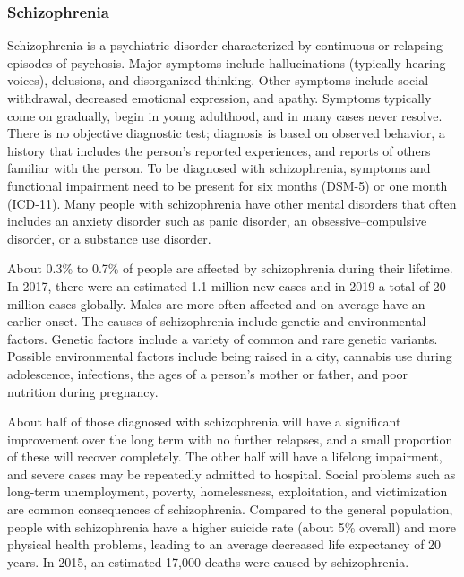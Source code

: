 \hypertarget{schizophrenia}{%
\subsubsection{Schizophrenia}\label{schizophrenia}}

Schizophrenia is a psychiatric disorder characterized by continuous or
relapsing episodes of psychosis. Major symptoms include hallucinations
(typically hearing voices), delusions, and disorganized thinking. Other
symptoms include social withdrawal, decreased emotional expression, and
apathy. Symptoms typically come on gradually, begin in young adulthood,
and in many cases never resolve. There is no objective diagnostic test;
diagnosis is based on observed behavior, a history that includes the
person's reported experiences, and reports of others familiar with the
person. To be diagnosed with schizophrenia, symptoms and functional
impairment need to be present for six months (DSM-5) or one month
(ICD-11). Many people with schizophrenia have other mental disorders
that often includes an anxiety disorder such as panic disorder, an
obsessive--compulsive disorder, or a substance use disorder.

About 0.3\% to 0.7\% of people are affected by schizophrenia during
their lifetime. In 2017, there were an estimated 1.1 million new cases
and in 2019 a total of 20 million cases globally. Males are more often
affected and on average have an earlier onset. The causes of
schizophrenia include genetic and environmental factors. Genetic factors
include a variety of common and rare genetic variants. Possible
environmental factors include being raised in a city, cannabis use
during adolescence, infections, the ages of a person's mother or father,
and poor nutrition during pregnancy.

About half of those diagnosed with schizophrenia will have a significant
improvement over the long term with no further relapses, and a small
proportion of these will recover completely. The other half will have a
lifelong impairment, and severe cases may be repeatedly admitted to
hospital. Social problems such as long-term unemployment, poverty,
homelessness, exploitation, and victimization are common consequences of
schizophrenia. Compared to the general population, people with
schizophrenia have a higher suicide rate (about 5\% overall) and more
physical health problems, leading to an average decreased life
expectancy of 20 years. In 2015, an estimated 17,000 deaths were caused
by schizophrenia.

